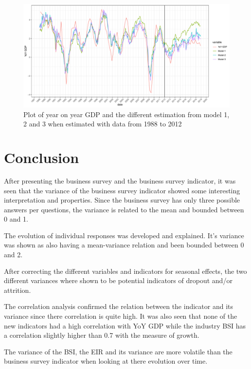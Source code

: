 \documentclass[12pt,a4paper,oneside]{book}
\begin{document}
\begin{figure}[H]
    \centering
    \includegraphics[scale=0.5]{Graphs/predictions3.pdf}
    \caption{Plot of year on year GDP and the different estimation from model 1, 2 and 3 when estimated with data from 1988 to 2012}
    \label{fig:predictions3}
\end{figure}




\chapter{Conclusion}

After presenting the business survey and the business survey indicator, it was seen that the variance of the business survey indicator showed some interesting interpretation and properties. 
Since the business survey has only three possible answers per questions, the variance is related to the mean and bounded between 0 and 1.

The evolution of individual responses was developed and explained.
It's variance was shown as also having a mean-variance relation and been bounded between 0 and 2.

After correcting the different variables and indicators for seasonal effects, the two different variances where shown to be potential indicators of dropout and/or attrition.

The correlation analysis confirmed the relation between the indicator and its variance since there correlation is quite high. 
It was also seen that none of the new indicators had a high correlation with YoY GDP while the industry BSI has a correlation slightly higher than 0.7 with the measure of growth.

The variance of the BSI, the EIR and its variance are more volatile than the business survey indicator when looking at there evolution over time.
\end{document}
